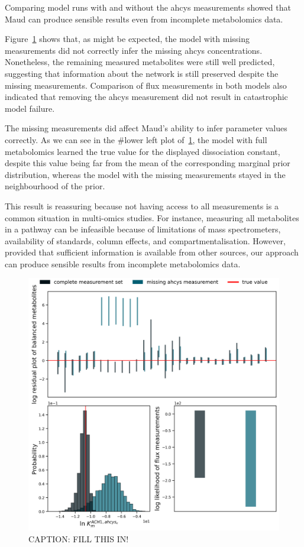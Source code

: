 \documentclass[
  letterpaper,
  DIV=11,
  numbers=noendperiod]{scrartcl}
\begin{document}
Comparing model runs with and without the ahcys measurements showed that
Maud can produce sensible results even from incomplete metabolomics
data.

Figure~\ref{fig-missing} shows that, as might be expected, the model
with missing measurements did not correctly infer the missing ahcys
concentrations. Nonetheless, the remaining measured metabolites were
still well predicted, suggesting that information about the network is
still preserved despite the missing measurements. Comparison of flux
measurements in both models also indicated that removing the ahcys
measurement did not result in catastrophic model failure.

The missing measurements did affect Maud's ability to infer parameter
values correctly. As we can see in the \#lower left plot
of~\ref{fig-missing}, the model with full metabolomics learned the true
value for the displayed dissociation constant, despite this value being
far from the mean of the corresponding marginal prior distribution,
whereas the model with the missing measurements stayed in the
neighbourhood of the prior.

This result is reassuring because not having access to all measurements
is a common situation in multi-omics studies. For instance, measuring
all metabolites in a pathway can be infeasible because of limitations of
mass spectrometers, availability of standards, column effects, and
compartmentalisation. However, provided that sufficient information is
available from other sources, our approach can produce sensible results
from incomplete metabolomics data.

\begin{figure}

{\centering \includegraphics{./figures/missing.png}

}

\caption{\label{fig-missing}CAPTION: FILL THIS IN!}

\end{figure}
\end{document}
